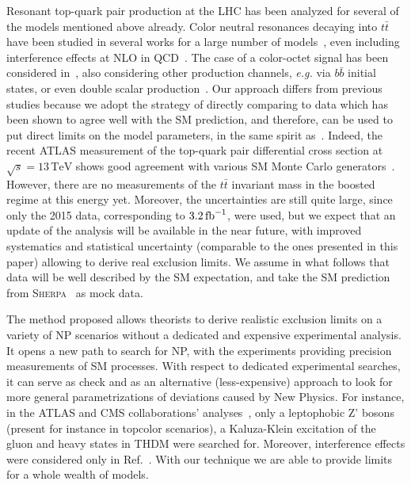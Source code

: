 \documentclass[aps,prd,amsmath,amssymb,superscriptaddress, preprintnumbers,preprint,nofootinbib,a4paper]{revtex4}
\newcommand{\TeV}{\,\text{TeV}}
\newcommand{\ifb}{\,{\rm fb}^{-1}}
\newcommand{\ttb}{t\bar{t}}
\def\Sherpa{\textsc{Sherpa}}
\begin{document}
Resonant top-quark pair production at the LHC has been analyzed for several of the models mentioned above already.  
Color neutral resonances decaying into $\ttb$ have been studied in several works for a large number of models~\cite{Gaemers:1984sj,Dicus:1994bm,Gori:2016zto,Jung:2015gta,Djouadi:2016ack}, even including interference effects at NLO in QCD~\cite{Bernreuther:2015fts,Hespel:2016qaf,BuarqueFranzosi:2017jrj}.
The case of a color-octet signal has been considered in~\cite{Frederix:2007gi,FileviezPerez:2008ib,Frolov:2016gvu,Hayreter:2017wra}, also considering other production channels, \emph{e.g.} via $b\bar{b}$ initial states, or even double scalar production~\cite{Gerbush:2007fe,Kim:2008bx,Schumann:2011ji}.
Our approach differs from previous studies because we adopt the strategy of directly comparing to data which has been shown
to agree well with the SM prediction, and therefore, can be used to put direct limits on the model parameters,
in the same spirit as~\cite{Butterworth:2016sqg}. 
Indeed, the recent ATLAS measurement of the top-quark pair differential cross section at $\sqrt{s}=13 \TeV$ shows good agreement with various SM Monte Carlo generators~\cite{Aaboud:2017fha}.
However, there are no measurements of the $\ttb$ invariant mass in the boosted regime at this energy yet.
Moreover, the uncertainties are still quite large, since only the 2015 data, corresponding to $3.2\ifb$,
were used, but we expect that an update of the analysis will be available in the near future, with
improved systematics and statistical uncertainty (comparable to the ones presented in this paper)
allowing to derive real exclusion limits. We assume in what follows that data will be well described
by the SM expectation, and take the SM prediction from \Sherpa~ as mock data. 

  The method proposed allows theorists to derive realistic exclusion limits on a variety of NP scenarios
  without a dedicated and expensive experimental analysis. It opens a new path to search for NP,
  with the experiments providing precision measurements of SM processes. With respect to dedicated experimental
  searches, it can serve as check and as an alternative (less-expensive) approach to look for more general
  parametrizations of deviations caused by New Physics. For instance, in the ATLAS and CMS collaborations'
  analyses~\cite{Khachatryan:2015sma,Chatrchyan:2013lca,Chatrchyan:2012cx,Sirunyan:2017uhk,Aaboud:2017hnm}, only
  a leptophobic Z' bosons (present for instance in topcolor scenarios), a Kaluza-Klein excitation of the gluon and heavy states in THDM were searched for. Moreover, interference effects were considered only in Ref.~\cite{Aaboud:2017hnm}.
  With our technique we are able to provide limits for a whole wealth of models.
\end{document}
